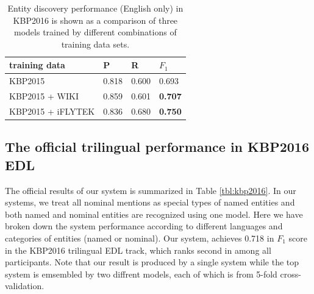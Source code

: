 \documentclass[11pt,a4paper]{article}
\begin{document}
\begin{table}[h]
	\centering
	\begin{tabular}{|l|ll|l|}
		\hline
		training data  &  P   &  R  &  $F_1$ \\ \hline \hline
		KBP2015 &  0.818 & 0.600 & 0.693 \\
		KBP2015 + WIKI  &   0.859 & 0.601 & \bf 0.707 \\	
		KBP2015 + iFLYTEK & 0.836 & 0.680 & \bf 0.750 \\
		\hline
	\end{tabular}
	\caption{Entity discovery performance (English only) in KBP2016 is shown as a comparison of three models trained by different combinations of training data sets. }
	\label{tbl:kbp2016-EDL1}	
\end{table}


\subsection{The official trilingual performance in KBP2016 EDL}


The official results of our system is summarized in Table \ref{tbl:kbp2016}.
In our systems, we treat all nominal mentions as special types of named entities and both named and nominal entities are recognized using one model. Here we have broken down the system performance according to different languages and categories of entities (named or nominal). Our system, achieves 0.718 in $F_1$ score in the KBP2016 trilingual EDL track, which ranks second in among all participants. Note that our result is produced by a single system while the top system is emsembled by two diffrent models, each of which is from 5-fold cross-validation.
\end{document}
